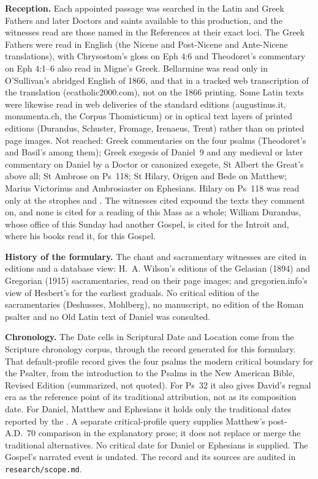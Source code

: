 {\textbf{Reception.} Each appointed passage was searched in the Latin and Greek
Fathers and later Doctors and saints available to this production, and the
witnesses read are those named in the References at their exact loci. The
Greek Fathers were read in English (the Nicene and Post-Nicene and Ante-Nicene
translations), with Chrysostom's gloss on Eph 4:6 and Theodoret's commentary on
Eph 4:1--6 also read in Migne's Greek. Bellarmine was read only in O'Sullivan's
abridged English of 1866, and that in a tracked web transcription of the
translation (ecatholic2000.com), not on the 1866 printing. Some Latin texts
were likewise read in web deliveries of the
standard editions (augustinus.it, monumenta.ch, the Corpus Thomisticum) or in
optical text layers of printed editions (Durandus, Schuster,
Fromage, Irenaeus, Trent) rather than on printed page images. Not reached:
Greek commentaries on the four psalms (Theodoret's and Basil's among them);
Greek exegesis of Daniel~9 and any medieval or later commentary on Daniel by a
Doctor or canonized exegete, St Albert the Great's above all; St Ambrose on
Ps~118; St Hilary, Origen and Bede on Matthew; Marius Victorinus and
Ambrosiaster on Ephesians. Hilary on Ps~118 was read only at the strophes
 and . The witnesses cited expound the texts they
comment on, and none is cited for a reading of this Mass as a whole; William
Durandus, whose office of this Sunday had another Gospel, is cited for the
Introit and, where his books read it, for this Gospel.

\textbf{History of the formulary.} The chant and sacramentary witnesses are
cited in editions and a database view: H.~A. Wilson's editions of the
Gelasian (1894) and Gregorian (1915) sacramentaries, read on their page images;
and gregorien.info's view of Hesbert's 
for the earliest graduals. No critical edition of the sacramentaries
(Deshusses, Mohlberg), no manuscript, no edition of the Roman psalter and no
Old Latin text of Daniel was consulted.

\textbf{Chronology.} The Date cells in Scriptural Date and Location
come from the Scripture chronology corpus, through the record generated for
this formulary. That default-profile record
gives the four psalms the modern critical boundary for the Psalter, from
the introduction to the Psalms in the New American Bible, Revised Edition
(summarized, not quoted). For Ps~32 it also gives David's regnal era as the
reference point of its traditional attribution, not as its composition date. For Daniel, Matthew and Ephesians it holds only the traditional dates
reported by the . A separate critical-profile
query supplies Matthew's post-A.D.~70 comparison in the explanatory prose;
it does not replace or merge the traditional alternatives. No critical date
for Daniel or Ephesians is supplied. The Gospel's narrated event is undated.
The record and its sources are audited in \texttt{research/scope.md}.

}
